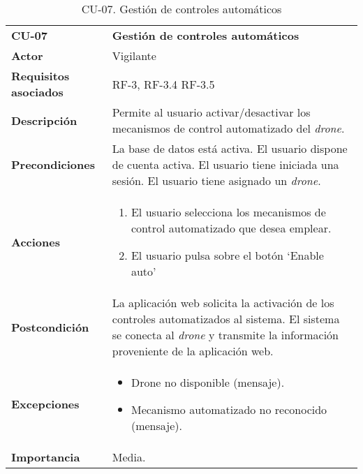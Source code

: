 \begin{table}[H]
	\begin{center}
		\begin{tabular}{m{3cm} | m{10cm}}\hline
			\toprule
			\textbf{CU-07} & \textbf{Gestión de controles automáticos}\\
			\otoprule
			\textbf{Actor} & Vigilante\\
			\textbf{Requisitos asociados} & RF-3, RF-3.4 RF-3.5\\
			\textbf{Descripción} & Permite al usuario activar/desactivar los mecanismos de control automatizado del \emph{drone}.\\
			\textbf{Precondiciones} & La base de datos está activa. El usuario dispone de cuenta activa. El usuario tiene iniciada una sesión. El usuario tiene asignado un \emph{drone}.\\
			\textbf{Acciones} & \begin{enumerate}
											\item El usuario selecciona los mecanismos de control automatizado que desea emplear.
											\item El usuario pulsa sobre el botón `Enable auto'
											\end{enumerate}\\
											
			\textbf{Postcondición} & La aplicación web solicita la activación de los controles automatizados al sistema. El sistema se conecta al \emph{drone} y transmite la información proveniente de la aplicación web.\\
			\textbf{Excepciones} & \begin{itemize}
												\item Drone no disponible (mensaje).
												\item Mecanismo automatizado no reconocido (mensaje).
												\end{itemize}\\
			\textbf{Importancia} & Media.\\
			\hline
			\bottomrule
		\end{tabular}
		\caption{CU-07. Gestión de controles automáticos}
		\label{tb:CU07}
	\end{center}
\end{table}


